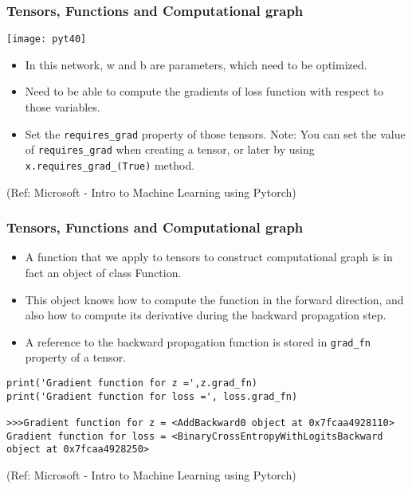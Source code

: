\begin{frame}[fragile] \frametitle{Tensors, Functions and Computational graph}

\begin{center}
\texttt{[image: pyt40]}
\end{center}

\begin{itemize}
\item In this network, w and b are parameters, which need to be optimized. 
\item Need to be able to compute the gradients of loss function with respect to those variables. 
\item Set the \lstinline|requires_grad| property of those tensors. Note: You can set the value of \lstinline|requires_grad| when creating a tensor, or later by using \lstinline|x.requires_grad_(True)| method.
\end{itemize}


\tiny{(Ref: Microsoft - Intro to Machine Learning using Pytorch)}
\end{frame}

\begin{frame}[fragile] \frametitle{Tensors, Functions and Computational graph}

\begin{itemize}
\item A function that we apply to tensors to construct computational graph is in fact an object of class Function. 
\item This object knows how to compute the function in the forward direction, and also how to compute its derivative during the backward propagation step. 
\item A reference to the backward propagation function is stored in \lstinline|grad_fn| property of a tensor.
\end{itemize}

\begin{lstlisting}
print('Gradient function for z =',z.grad_fn)
print('Gradient function for loss =', loss.grad_fn)

>>>Gradient function for z = <AddBackward0 object at 0x7fcaa4928110>
Gradient function for loss = <BinaryCrossEntropyWithLogitsBackward object at 0x7fcaa4928250>
\end{lstlisting}

\tiny{(Ref: Microsoft - Intro to Machine Learning using Pytorch)}
\end{frame}

